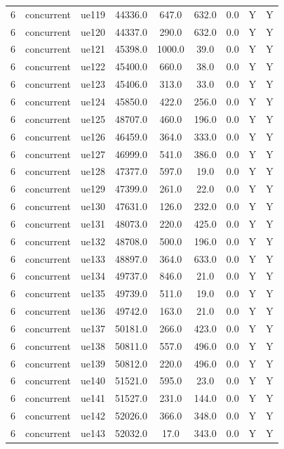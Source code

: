 \begin{table}[ht]
\begin{tabular}{|c|c|c|c|c|c|c|c|c|}
6 & concurrent & ue119 & 44336.0 & 647.0 & 632.0 & 0.0 & Y & Y \\
6 & concurrent & ue120 & 44337.0 & 290.0 & 632.0 & 0.0 & Y & Y \\
6 & concurrent & ue121 & 45398.0 & 1000.0 & 39.0 & 0.0 & Y & Y \\
6 & concurrent & ue122 & 45400.0 & 660.0 & 38.0 & 0.0 & Y & Y \\
6 & concurrent & ue123 & 45406.0 & 313.0 & 33.0 & 0.0 & Y & Y \\
6 & concurrent & ue124 & 45850.0 & 422.0 & 256.0 & 0.0 & Y & Y \\
6 & concurrent & ue125 & 48707.0 & 460.0 & 196.0 & 0.0 & Y & Y \\
6 & concurrent & ue126 & 46459.0 & 364.0 & 333.0 & 0.0 & Y & Y \\
6 & concurrent & ue127 & 46999.0 & 541.0 & 386.0 & 0.0 & Y & Y \\
6 & concurrent & ue128 & 47377.0 & 597.0 & 19.0 & 0.0 & Y & Y \\
6 & concurrent & ue129 & 47399.0 & 261.0 & 22.0 & 0.0 & Y & Y \\
6 & concurrent & ue130 & 47631.0 & 126.0 & 232.0 & 0.0 & Y & Y \\
6 & concurrent & ue131 & 48073.0 & 220.0 & 425.0 & 0.0 & Y & Y \\
6 & concurrent & ue132 & 48708.0 & 500.0 & 196.0 & 0.0 & Y & Y \\
6 & concurrent & ue133 & 48897.0 & 364.0 & 633.0 & 0.0 & Y & Y \\
6 & concurrent & ue134 & 49737.0 & 846.0 & 21.0 & 0.0 & Y & Y \\
6 & concurrent & ue135 & 49739.0 & 511.0 & 19.0 & 0.0 & Y & Y \\
6 & concurrent & ue136 & 49742.0 & 163.0 & 21.0 & 0.0 & Y & Y \\
6 & concurrent & ue137 & 50181.0 & 266.0 & 423.0 & 0.0 & Y & Y \\
6 & concurrent & ue138 & 50811.0 & 557.0 & 496.0 & 0.0 & Y & Y \\
6 & concurrent & ue139 & 50812.0 & 220.0 & 496.0 & 0.0 & Y & Y \\
6 & concurrent & ue140 & 51521.0 & 595.0 & 23.0 & 0.0 & Y & Y \\
6 & concurrent & ue141 & 51527.0 & 231.0 & 144.0 & 0.0 & Y & Y \\
6 & concurrent & ue142 & 52026.0 & 366.0 & 348.0 & 0.0 & Y & Y \\
6 & concurrent & ue143 & 52032.0 & 17.0 & 343.0 & 0.0 & Y & Y \\

\end{tabular}
\end{table}
